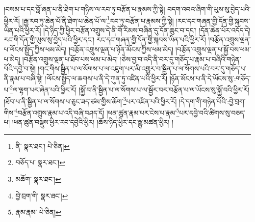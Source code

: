 །བསམ་པ་དང་བློ་ཞན་པ་ནི་ཐེག་པ་གཉིས་ལ་རབ་ཏུ་བརྩོན་པ་རྣམས་ཀྱི་སྟེ། བདག་འབའ་ཞིག་གི་ཡུས་སུ་བྱེད་པའི་ཕྱིར་རོ། །རྒྱ་རབ་ཏུ་ཆེན་པོ་ནི་ཐེག་པ་ཆེན་པོ་ལ་\footnote{ནི་  སྣར་ཐང་།  པེ་ཅིན། }རབ་ཏུ་བརྩོན་པ་རྣམས་ཀྱི་སྟེ། །རང་དང་གཞན་གྱི་དོན་གྱི་སྐབས་ཡིན་པའི་ཕྱིར་རོ། །དེ་ཉིད་ཀྱི་ཕྱིར་བརྩོན་འགྲུས་དེ་ནི་གོ་རིམས་བཞིན་དུ་དོན་ཆུང་བ་དང་། །དོན་ཆེན་པོར་འདོད་དེ། རང་གི་དོན་གྱི་ཡུས་སུ་བྱེད་པའི་ཕྱིར་དང་། རང་དང་གཞན་གྱི་དོན་གྱི་སྐབས་ཡིན་པའི་ཕྱིར་རོ། །བརྩོན་འགྲུས་ལྡན་པ་ལོངས་སྤྱོད་ཀྱིས་ཕམ་མེད། །བརྩོན་འགྲུས་ལྡན་པ་ཉོན་མོངས་ཀྱིས་ཕམ་མེད། །བརྩོན་འགྲུས་ལྡན་པ་སྐྱོ་བས་ཕམ་པ་མེད། །བརྩོན་འགྲུས་ལྡན་པ་ཐོབ་པས་ཕམ་པ་མེད། །ཅེས་བྱ་བ་འདི་ནི་བར་དུ་གཅོད་པ་རྣམ་པ་བཞིའི་གཉེན་པོའི་དབྱེ་བ་སྟེ། །གང་གིས་སྦྱིན་པ་ལ་སོགས་པ་ལ་འཇུག་པར་མི་འགྱུར་བ་སྦྱིན་པ་ལ་སོགས་པའི་བར་དུ་གཅོད་པ་ནི་རྣམ་པ་བཞི་སྟེ། །ལོངས་སྤྱོད་ལ་ཆགས་པ་ནི་དེ་ཀུན་ཏུ་འཛིན་པའི་ཕྱིར་རོ། །ཉོན་མོངས་པ་ནི་དེ་ཡོངས་སུ་:གཅོད་པ་\footnote{བཅོད་པ་  སྣར་ཐང་། }ལ་ལྷག་པར་ཞེན་པའི་ཕྱིར་རོ། །སྐྱོ་བ་ནི་སྦྱིན་པ་ལ་སོགས་པ་ལ་སྦྱོར་བར་བརྩོན་པ་ལ་ཡོངས་སུ་སྐྱོ་བའི་ཕྱིར་རོ། །ཐོབ་པ་ནི་སྦྱིན་པ་ལ་སོགས་པ་ཅུང་ཟད་ཙམ་གྱིས་ཆོག་\footnote{མཆོག་  སྣར་ཐང་། }པར་འཛིན་པའི་ཕྱིར་རོ། །དེ་དག་གི་གཉེན་པོའི་:བྱེ་བྲག་གིས་\footnote{བྱེ་བྲག་གི་  སྣར་ཐང་། }བརྩོན་འགྲུས་རྣམ་པ་འདི་བཞི་བཤད་དོ། །ཕན་ཚུན་རྣམ་པར་ངེས་པ་རྣམ་\footnote{རྣམ་རྣམ་  པེ་ཅིན། }པར་དབྱེ་བའི་ཚིགས་སུ་བཅད་པ། །ཕན་ཚུན་བསྡུས་ཕྱིར་རབ་དབྱེའི་ཕྱིར། །ཆོས་ཉིད་ཕྱིར་དང་རྒྱུ་མཚན་ཕྱིར། །
